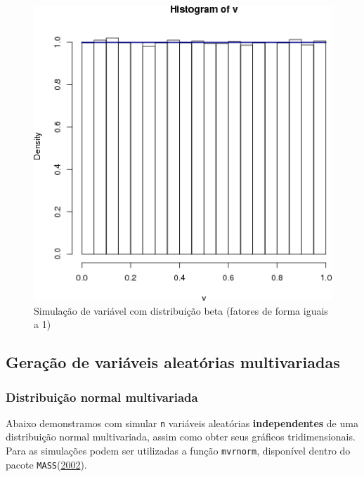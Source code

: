 \documentclass[a4paper]{article}
\begin{document}
\begin{figure}[H]

{\centering \includegraphics[width=0.7\linewidth]{images/rbeta2-1} 

}

\caption{Simulação de variável com distribuição beta (fatores de forma iguais a 1)}\label{fig:rbeta2}
\end{figure}

\subsection{Geração de variáveis aleatórias
multivariadas}\label{geracao-de-variaveis-aleatorias-multivariadas}

\subsubsection{Distribuição normal
multivariada}\label{distribuicao-normal-multivariada}

Abaixo demonstramos com simular \texttt{n} variáveis aleatórias
\textbf{independentes} de uma distribuição normal multivariada, assim
como obter seus gráficos tridimensionais. Para as simulações podem ser
utilizadas a função \texttt{mvrnorm}, disponível dentro do pacote
\texttt{MASS}(\protect\hyperlink{ref-MASS}{2002}).
\end{document}
